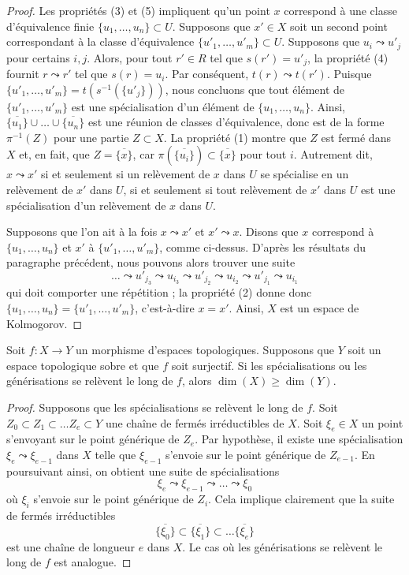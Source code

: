 \begin{proof}
Les propriétés (3) et (5) impliquent qu'un point $x$ correspond à une classe
d'équivalence finie $\{u_1, \ldots, u_n\} \subset U$. Supposons que
$x' \in X$ soit un second point correspondant à la classe d'équivalence
$\{u'_1, \ldots, u'_m\} \subset U$.
Supposons que $u_i \leadsto u'_j$ pour certains $i, j$. Alors, pour tout
$r' \in R$ tel que $s(r') = u'_j$, la propriété (4) fournit
$r \leadsto r'$ tel que $s(r) = u_i$. Par conséquent,
$t(r) \leadsto t(r')$. Puisque
$\{u'_1, \ldots, u'_m\} = t(s^{-1}(\{u'_j\}))$, nous concluons que tout
élément de $\{u'_1, \ldots, u'_m\}$ est une spécialisation d'un élément de
$\{u_1, \ldots, u_n\}$.
Ainsi, $\overline{\{u_1\}} \cup \ldots \cup \overline{\{u_n\}}$ est une
réunion de classes d'équivalence, donc est de la forme $\pi^{-1}(Z)$ pour une
partie $Z \subset X$. La propriété (1) montre que $Z$ est fermé dans $X$ et,
en fait, que $Z = \overline{\{x\}}$, car
$\pi(\overline{\{u_i\}}) \subset \overline{\{x\}}$ pour tout $i$.
Autrement dit, $x \leadsto x'$ si et seulement si un relèvement de $x$ dans
$U$ se spécialise en un relèvement de $x'$ dans $U$, si et seulement si tout
relèvement de $x'$ dans $U$ est une spécialisation d'un relèvement de $x$
dans $U$.

\medskip\noindent
Supposons que l'on ait à la fois $x \leadsto x'$ et $x' \leadsto x$.
Disons que $x$ correspond à $\{u_1, \ldots, u_n\}$ et $x'$ à
$\{u'_1, \ldots, u'_m\}$, comme ci-dessus. D'après les résultats du paragraphe
précédent, nous pouvons alors trouver une suite
$$
\ldots \leadsto u'_{j_3} \leadsto u_{i_3} \leadsto u'_{j_2} \leadsto
u_{i_2} \leadsto u'_{j_1} \leadsto u_{i_1}
$$
qui doit comporter une répétition ; la propriété (2) donne donc
$\{u_1, \ldots, u_n\} = \{u'_1, \ldots, u'_m\}$, c'est-à-dire $x = x'$.
Ainsi, $X$ est un espace de Kolmogorov.
\end{proof}


\begin{lemma}
\label{lemma-dimension-specializations-lift}
Soit $f : X \to Y$ un morphisme d'espaces topologiques.
Supposons que $Y$ soit un espace topologique sobre et que $f$ soit surjectif.
Si les spécialisations ou les générisations se relèvent le long de $f$, alors
$\dim(X) \geq \dim(Y)$.
\end{lemma}

\begin{proof}
Supposons que les spécialisations se relèvent le long de $f$.
Soit $Z_0 \subset Z_1 \subset \ldots Z_e \subset Y$ une chaîne de fermés
irréductibles de $X$. Soit $\xi_e \in X$ un point s'envoyant sur le point
générique de $Z_e$. Par hypothèse, il existe une spécialisation
$\xi_e \leadsto \xi_{e - 1}$ dans $X$ telle que $\xi_{e - 1}$ s'envoie sur le
point générique de $Z_{e - 1}$. En poursuivant ainsi, on obtient une suite de
spécialisations
$$
\xi_e \leadsto \xi_{e - 1} \leadsto \ldots \leadsto \xi_0
$$
où $\xi_i$ s'envoie sur le point générique de $Z_i$.
Cela implique clairement que la suite de fermés irréductibles
$$
\overline{\{\xi_0\}} \subset
\overline{\{\xi_1\}} \subset \ldots
\overline{\{\xi_e\}}
$$
est une chaîne de longueur $e$ dans $X$.
Le cas où les générisations se relèvent le long de $f$ est analogue.
\end{proof}

